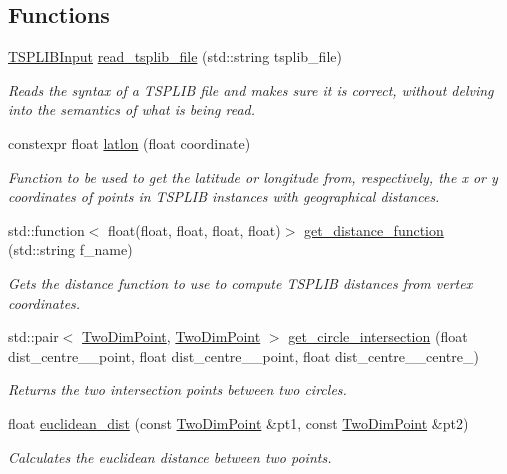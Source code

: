 \subsection*{Functions}
\begin{DoxyCompactItemize}
\item 
\hyperlink{classas_1_1tsplib_1_1detail_1_1TSPLIBInput}{T\+S\+P\+L\+I\+B\+Input} \hyperlink{namespaceas_1_1tsplib_1_1detail_a3fabd21c4bc13069fbe2bcb9b6c59e74}{read\+\_\+tsplib\+\_\+file} (std\+::string tsplib\+\_\+file)
\begin{DoxyCompactList}\small\item\em Reads the syntax of a T\+S\+P\+L\+IB file and makes sure it is correct, without delving into the semantics of what is being read. \end{DoxyCompactList}\item 
constexpr float \hyperlink{namespaceas_1_1tsplib_1_1detail_a3ae3133c661a1284988d3615f1a3e3d1}{latlon} (float coordinate)
\begin{DoxyCompactList}\small\item\em Function to be used to get the latitude or longitude from, respectively, the x or y coordinates of points in T\+S\+P\+L\+IB instances with geographical distances. \end{DoxyCompactList}\item 
std\+::function$<$ float(float, float, float, float)$>$ \hyperlink{namespaceas_1_1tsplib_1_1detail_aa87df60b8ef17c19d0cb8329a7a28731}{get\+\_\+distance\+\_\+function} (std\+::string f\+\_\+name)
\begin{DoxyCompactList}\small\item\em Gets the distance function to use to compute T\+S\+P\+L\+IB distances from vertex coordinates. \end{DoxyCompactList}\item 
std\+::pair$<$ \hyperlink{structas_1_1TwoDimPoint}{Two\+Dim\+Point}, \hyperlink{structas_1_1TwoDimPoint}{Two\+Dim\+Point} $>$ \hyperlink{namespaceas_1_1tsplib_1_1detail_a1337beecf37622b3597de699f3852380}{get\+\_\+circle\+\_\+intersection} (float dist\+\_\+centre\+\_\+\_\+point, float dist\+\_\+centre\+\_\+\_\+point, float dist\+\_\+centre\+\_\+\_\+centre\+\_)
\begin{DoxyCompactList}\small\item\em Returns the two intersection points between two circles. \end{DoxyCompactList}\item 
float \hyperlink{namespaceas_1_1tsplib_1_1detail_a6b7b8b134e00f78387c5fe70f5791572}{euclidean\+\_\+dist} (const \hyperlink{structas_1_1TwoDimPoint}{Two\+Dim\+Point} \&pt1, const \hyperlink{structas_1_1TwoDimPoint}{Two\+Dim\+Point} \&pt2)
\begin{DoxyCompactList}\small\item\em Calculates the euclidean distance between two points. \end{DoxyCompactList}\end{DoxyCompactItemize}


